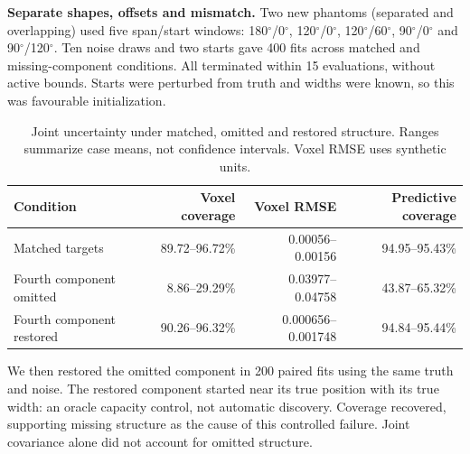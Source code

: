 \documentclass[11pt,a4paper]{article}
\newcommand{\degree}{\ensuremath{^{\circ}}}
\begin{document}
\textbf{Separate shapes, offsets and mismatch.} Two new phantoms (separated and overlapping) used five span/start windows: 180\degree{}/0\degree{}, 120\degree{}/0\degree{}, 120\degree{}/60\degree{}, 90\degree{}/0\degree{} and 90\degree{}/120\degree{}. Ten noise draws and two starts gave 400 fits across matched and missing-component conditions. All terminated within 15 evaluations, without active bounds. Starts were perturbed from truth and widths were known, so this was favourable initialization.
\begin{table}[H]\centering\small
\caption{Joint uncertainty under matched, omitted and restored structure. Ranges summarize case means, not confidence intervals. Voxel RMSE uses synthetic units.}
\begin{tabular}{lrrr}\toprule
Condition & Voxel coverage & Voxel RMSE & Predictive coverage\\\midrule
Matched targets & 89.72--96.72\% & 0.00056--0.00156 & 94.95--95.43\%\\
Fourth component omitted & 8.86--29.29\% & 0.03977--0.04758 & 43.87--65.32\%\\
Fourth component restored & 90.26--96.32\% & 0.000656--0.001748 & 94.84--95.44\%\\\bottomrule
\end{tabular}\end{table}
We then restored the omitted component in 200 paired fits using the same truth and noise. The restored component started near its true position with its true width: an oracle capacity control, not automatic discovery. Coverage recovered, supporting missing structure as the cause of this controlled failure. Joint covariance alone did not account for omitted structure.
\end{document}
